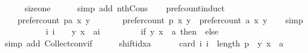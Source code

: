\begin{isabellebody}
\ \ \ \ \isamarkupfalse%
\ size{\isacharunderscore}{\kern0pt}one\isanewline
\ \ \ \ \isamarkupfalse%
\ {\isacharparenleft}{\kern0pt}simp\ add{\isacharcolon}{\kern0pt}\ nth{\isacharunderscore}{\kern0pt}Cons{\isacharprime}{\kern0pt}{\isacharparenright}{\kern0pt}\isanewline
\ \ \isamarkupfalse%
\ pref{\isacharunderscore}{\kern0pt}count{\isacharunderscore}{\kern0pt}induct{\isacharcolon}{\kern0pt}\isanewline
\ \ \ \ {\isachardoublequoteopen}prefer{\isacharunderscore}{\kern0pt}count\ {\isacharparenleft}{\kern0pt}p{\isacharat}{\kern0pt}{\isacharbrackleft}{\kern0pt}a{\isacharbrackright}{\kern0pt}{\isacharparenright}{\kern0pt}\ x\ y\ {\isacharequal}{\kern0pt}\isanewline
\ \ \ \ \ \ prefer{\isacharunderscore}{\kern0pt}count\ p\ x\ y\ {\isacharplus}{\kern0pt}\ prefer{\isacharunderscore}{\kern0pt}count\ {\isacharbrackleft}{\kern0pt}a{\isacharbrackright}{\kern0pt}\ x\ y{\isachardoublequoteclose}\isanewline
\ \ \isamarkupfalse%
\ {\isacharparenleft}{\kern0pt}simp{\isacharparenright}{\kern0pt}\isanewline
\ \ \ \ \isamarkupfalse%
\isanewline
\ \ \ \ \ \ {\isachardoublequoteopen}{\isacharbraceleft}{\kern0pt}i{\isachardot}{\kern0pt}\ i\ {\isacharequal}{\kern0pt}\ {}\ {\isasymand}\ {\isacharparenleft}{\kern0pt}y{\isacharcomma}{\kern0pt}\ x{\isacharparenright}{\kern0pt}\ {\isasymin}\ {\isacharbrackleft}{\kern0pt}a{\isacharbrackright}{\kern0pt}{\isacharbang}{\kern0pt}i{\isacharbraceright}{\kern0pt}\ {\isacharequal}{\kern0pt}\isanewline
\ \ \ \ \ \ \ \ {\isacharparenleft}{\kern0pt}if\ {\isacharparenleft}{\kern0pt}{\isacharparenleft}{\kern0pt}y{\isacharcomma}{\kern0pt}\ x{\isacharparenright}{\kern0pt}\ {\isasymin}\ a{\isacharparenright}{\kern0pt}\ then\ {\isacharbraceleft}{\kern0pt}{}{\isacharbraceright}{\kern0pt}\ else\ {\isacharbraceleft}{\kern0pt}{\isacharbraceright}{\kern0pt}{\isacharparenright}{\kern0pt}{\isachardoublequoteclose}\isanewline
\ \ \ \ \ \ \isamarkupfalse%
\ {\isacharparenleft}{\kern0pt}simp\ add{\isacharcolon}{\kern0pt}\ Collect{\isacharunderscore}{\kern0pt}conv{\isacharunderscore}{\kern0pt}if{\isacharparenright}{\kern0pt}\isanewline
\ \ \ \ \isamarkupfalse%
\ shift{\isacharunderscore}{\kern0pt}idx{\isacharunderscore}{\kern0pt}a{\isacharcolon}{\kern0pt}\isanewline
\ \ \ \ \ \ {\isachardoublequoteopen}card\ {\isacharbraceleft}{\kern0pt}i{\isachardot}{\kern0pt}\ i\ {\isacharequal}{\kern0pt}\ length\ p\ {\isasymand}\ {\isacharparenleft}{\kern0pt}y{\isacharcomma}{\kern0pt}\ x{\isacharparenright}{\kern0pt}\ {\isasymin}\ {\isacharbrackleft}{\kern0pt}a{\isacharbrackright}{\kern0pt}{\isacharbang}{\kern0pt}{}{\isacharbraceright}{\kern0pt}\ {\isacharequal}{\kern0pt}\isanewline

\end{isabellebody}
